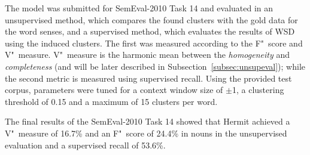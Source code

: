 The model was submitted for SemEval-2010 Task 14 \citep{manandhar2009semeval}
and evaluated in an unsupervised method, which compares the found clusters with 
the gold data for the word senses, and a supervised method, which evaluates the 
results of \ac{WSD} using the induced clusters. The first was measured
according to the F"~score and V"~measure. V"~measure is the harmonic mean 
between the \emph{homogeneity} and \emph{completeness} (and will be later 
described in Subsection~\ref{subsec:unsupeval}); while the second metric is 
measured using supervised recall. Using the provided test corpus, parameters 
were tuned for a context window size of $\pm$1, a clustering threshold of 0.15 
and a maximum of 15 clusters per word.

The final results of the SemEval-2010 Task 14 showed that Hermit achieved a
V"~measure of 16.7\% and an F"~score of 24.4\% in nouns in the unsupervised
evaluation and a supervised recall of 53.6\%.


